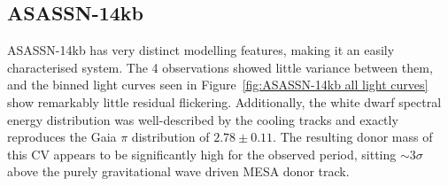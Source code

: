 \newpage
\subsection{ASASSN-14kb}

ASASSN-14kb has very distinct modelling features, making it an easily characterised system. The 4 observations showed little variance between them, and the binned light curves seen in Figure~\ref{fig:ASASSN-14kb all light curves} show remarkably little residual flickering. Additionally, the white dwarf spectral energy distribution was well-described by the cooling tracks and exactly reproduces the Gaia $\pi$ distribution of $2.78\pm0.11$.
The resulting donor mass of this CV appears to be significantly high for the observed period, sitting $\sim 3\sigma$ above the purely gravitational wave driven MESA donor track.

%     


